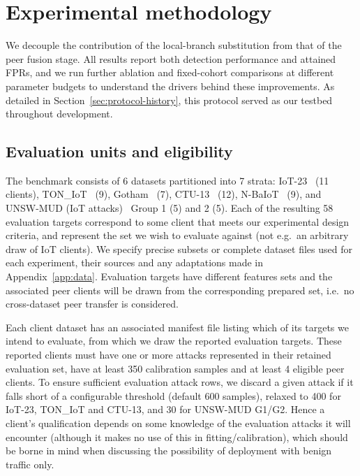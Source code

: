 \section{Experimental methodology} 
\label{sec:experiment} 
We decouple the contribution of the local-branch substitution from that of the peer fusion stage. All results report both detection performance and attained FPRs, and we run further ablation and fixed-cohort comparisons at different parameter budgets to understand the drivers behind these improvements. As detailed in Section~\ref{sec:protocol-history}, this protocol served as our testbed throughout development.
\subsection{Evaluation units and eligibility} 
The benchmark consists of 6 datasets partitioned into 7 strata: IoT-23~\cite{garcia2020iot23} (11 clients), TON\_IoT~\cite{moustafa2021ton} (9), Gotham~\cite{belarbi2025gothamdata,belarbi2026descriptor} (7), CTU-13~\cite{garcia2014ctu} (12), N-BaIoT~\cite{nbaiot2018,nbaiotdata2018} (9), and UNSW-MUD (IoT attacks)~\cite{hamza2019mud} Group 1 (5) and 2 (5). Each of the resulting 58 evaluation targets correspond to some client that meets our experimental design criteria, and represent the set we wish to evaluate against (not e.g.\ an arbitrary draw of IoT clients). We specify precise subsets or complete dataset files used for each experiment, their sources and any adaptations made in Appendix~\ref{app:data}. Evaluation targets have different features sets and the associated peer clients will be drawn from the corresponding prepared set, i.e.\ no cross-dataset peer transfer is considered.

Each client dataset has an associated manifest file listing which of its targets we intend to evaluate, from which we draw the reported evaluation targets. These reported clients must have one or more attacks represented in their retained evaluation set, have at least 350 calibration samples and at least 4 eligible peer clients. To ensure sufficient evaluation attack rows, we discard a given attack if it falls short of a configurable threshold (default 600 samples), relaxed to 400 for IoT-23, TON\_IoT and CTU-13, and 30 for UNSW-MUD G1/G2. Hence a client's qualification depends on some knowledge of the evaluation attacks it will encounter (although it makes no use of this in fitting/calibration), which should be borne in mind when discussing the possibility of deployment with benign traffic only.

